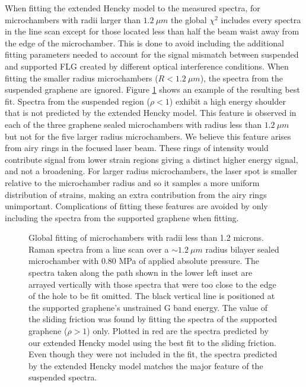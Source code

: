 When fitting the extended Hencky model to the measured spectra, for microchambers with radii larger than $1.2 \ \mu m$ the global $\chi^2$ includes every spectra in the line scan except for those located less than half the beam waist away from the edge of the microchamber.
This is done to avoid including the additional fitting parameters needed to account for the signal mismatch between suspended and supported FLG created by different optical interference conditions.
When fitting the smaller radius microchambers ($R<1.2 \ \mu m$), the spectra from the suspended graphene are ignored.
Figure \ref{fig:fri:igouter} shows an example of the resulting best fit.
Spectra from the suspended region ($\rho<1$) exhibit a high energy shoulder that is not predicted by the extended Hencky model.
This feature is observed in each of the three graphene sealed microchambers with radius less than $1.2 \ \mu m$ but not for the five larger radius microchambers.
We believe this feature arises from airy rings in the focused laser beam.
These rings of intensity would contribute signal from lower strain regions giving a distinct higher energy signal, and not a broadening.
For larger radius microchambers, the laser spot is smaller relative to the microchamber radius and so it samples a more uniform distribution of strains, making an extra contribution from the airy rings unimportant.
Complications of fitting these features are avoided by only including the spectra from the supported graphene when fitting.  

\begin{figure}
	\begin{center}
	
	\end{center}
	\caption[Global fitting of microchambers with radii less than 1.2 microns]{\label{fig:fri:igouter} Global fitting of microchambers with radii less than 1.2 microns. Raman spectra from a line scan over a $\sim 1.2 \ \mu m$ radius bilayer sealed microchamber with 0.80 MPa of applied absolute pressure. The spectra taken along the path shown in the lower left inset are arrayed vertically with those spectra that were too close to the edge of the hole to be fit omitted.  The black vertical line is positioned at the supported graphene's unstrained G band energy.  The value of the sliding friction was found by fitting the spectra of the supported graphene ($\rho>1$) only.  Plotted in red are the spectra predicted by our extended Hencky model using the best fit to the sliding friction.  Even though they were not included in the fit, the spectra predicted by the extended Hencky model matches the major feature of the suspended spectra. }
\end{figure}

